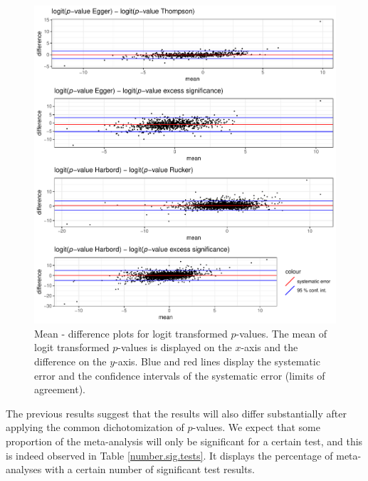 \documentclass[11pt,a4paper,twoside]{book}\usepackage[]{graphicx}\usepackage[]{color}
\newenvironment{knitrout}{}{} %
\begin{document}
\begin{figure}
\begin{knitrout}
\color{fgcolor}

{\centering \includegraphics[width=\textwidth-3cm]{figure/ch03_figunnamed-chunk-13-1} 

}



\end{knitrout}
\caption{Mean - difference plots for logit transformed $p$-values. The mean of logit transformed $p$-values is displayed on the $x$-axis and the difference on the $y$-axis. Blue and red lines display the systematic error and the confidence intervals of the systematic error (limits of agreement).}
\label{fig:mean.diff.test}
\end{figure}

The previous results suggest that the results will also differ substantially after applying the common dichotomization of $p$-values. We expect that some proportion of the meta-analysis will only be significant for a certain test, and this is indeed observed in Table \ref{number.sig.tests}. It displays the percentage of meta-analyses with a certain number of significant test results.
\end{document}
